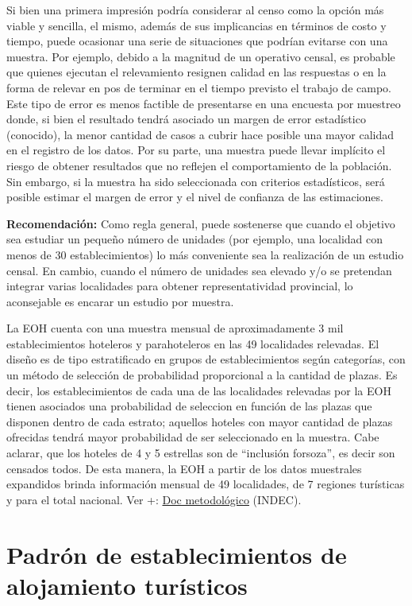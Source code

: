 \documentclass[
]{book}
\begin{document}
Si bien una primera impresión podría considerar al censo como la opción más viable y sencilla, el mismo, además de sus implicancias en términos de costo y tiempo, puede ocasionar una serie de situaciones que podrían evitarse con una muestra. Por ejemplo, debido a la magnitud de un operativo censal, es probable que quienes ejecutan el relevamiento resignen calidad en las respuestas o en la forma de relevar en pos de terminar en el tiempo previsto el trabajo de campo. Este tipo de error es menos factible de presentarse en una encuesta por muestreo donde, si bien el resultado tendrá asociado un margen de error estadístico (conocido), la menor cantidad de casos a cubrir hace posible una mayor calidad en el registro de los datos. Por su parte, una muestra puede llevar implícito el riesgo de obtener resultados que no reflejen el comportamiento de la población. Sin embargo, si la muestra ha sido seleccionada con criterios estadísticos, será posible estimar el margen de error y el nivel de confianza de las estimaciones.

\textbf{Recomendación:} Como regla general, puede sostenerse que cuando el objetivo sea estudiar un pequeño número de unidades (por ejemplo, una localidad con menos de 30 establecimientos) lo más conveniente sea la realización de un estudio censal. En cambio, cuando el número de unidades sea elevado y/o se pretendan integrar varias localidades para obtener representatividad provincial, lo aconsejable es encarar un estudio por muestra.

La EOH cuenta con una muestra mensual de aproximadamente 3 mil establecimientos hoteleros y parahoteleros en las 49 localidades relevadas. El diseño es de tipo estratificado en grupos de establecimientos según categorías, con un método de selección de probabilidad proporcional a la cantidad de plazas. Es decir, los establecimientos de cada una de las localidades relevadas por la EOH tienen asociados una probabilidad de seleccion en función de las plazas que disponen dentro de cada estrato; aquellos hoteles con mayor cantidad de plazas ofrecidas tendrá mayor probabilidad de ser seleccionado en la muestra. Cabe aclarar, que los hoteles de 4 y 5 estrellas son de ``inclusión forsoza'', es decir son censados todos. De esta manera, la EOH a partir de los datos muestrales expandidos brinda información mensual de 49 localidades, de 7 regiones turísticas y para el total nacional. Ver +: \href{https://www.indec.gob.ar/ftp/cuadros/economia/eoh_aspectos_metodologicos.pdf}{Doc metodológico} (INDEC).

\hypertarget{padruxf3n-de-establecimientos-de-alojamiento-turuxedsticos}{%
\section{Padrón de establecimientos de alojamiento turísticos}\label{padruxf3n-de-establecimientos-de-alojamiento-turuxedsticos}}
\end{document}
